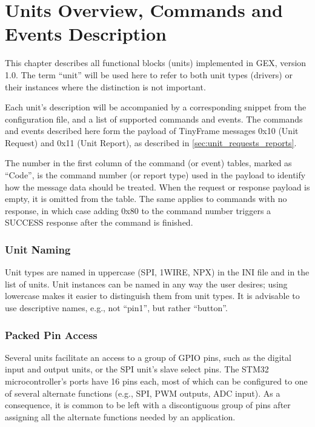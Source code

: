 \chapter{Units Overview, Commands and Events Description} \label{sec:units-overview}

This chapter describes all functional blocks (units) implemented in GEX, version 1.0. The term ``unit'' will be used here to refer to both unit types (drivers) or their instances where the distinction is not important.

Each unit's description will be accompanied by a corresponding snippet from the configuration file, and a list of supported commands and events. The commands and events described here form the payload of TinyFrame messages 0x10 (Unit Request) and 0x11 (Unit Report), as described in \cref{sec:unit_requests_reports}.

The number in the first column of the command (or event) tables, marked as ``Code'', is the command number (or report type) used in the payload to identify how the message data should be treated. When the request or response payload is empty, it is omitted from the table. The same applies to commands with no response, in which case adding 0x80 to the command number triggers a SUCCESS response after the command is finished.

\subsection{Unit Naming}

Unit types are named in uppercase (SPI, 1WIRE, NPX) in the INI file and in the list of units. Unit instances can be named in any way the user desires; using lowercase makes it easier to distinguish them from unit types. It is advisable to use descriptive names, e.g., not ``pin1'', but rather ``button''.

\subsection{Packed Pin Access} \label{sec:packedpins}

Several units facilitate an access to a group of GPIO pins, such as the digital input and output units, or the SPI unit's slave select pins. The STM32 microcontroller's ports have 16 pins each, most of which can be configured to one of several alternate functions (e.g., SPI, PWM outputs, ADC input). As a consequence, it is common to be left with a discontiguous group of pins after assigning all the alternate functions needed by an application.

